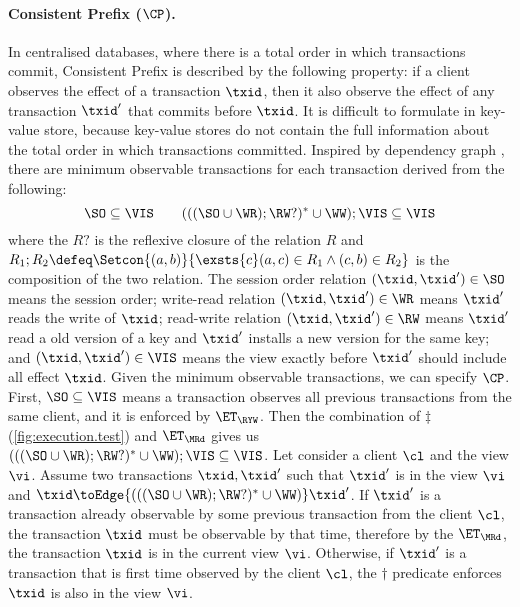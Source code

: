 \paragraph{Consistent Prefix ($\CP$).}
\label{para:cp}
In centralised databases, where there is a total order in which transactions commit, 
Consistent Prefix is described by the following property: 
if a client observes the effect of a transaction $\txid$,
then it also observe the effect of any transaction $\txid'$ that commits before $\txid$.
It is difficult to formulate in key-value store,
because key-value stores do not contain the full information about the total order in which transactions committed. 
Inspired by dependency graph \cite{.....},
there are minimum observable transactions for each transaction derived from the following:
\[
    \SO  \subseteq  \VIS \qquad
    ( ( ( \SO \cup \WR ) ; \RW? )^* \cup \WW ) ; \VIS \subseteq \VIS
\]
where the \( R? \) is the reflexive closure of the relation \( R \) 
and \( R_1 ; R_2 \defeq \Setcon{(a,b)}{\exsts{c} (a,c) \in R_1 \land (c,b) \in R_2 } \) is the composition of the two relation.
The session order relation \( (\txid, \txid') \in \SO \) means the session order;
write-read relation \( (\txid, \txid') \in \WR \) means \( \txid' \) reads the write of \( \txid \);
read-write relation \( (\txid, \txid') \in \RW \) means \( \txid' \) read a old version of a key 
and \( \txid' \) installs a new version for the same key;
and \( (\txid, \txid') \in \VIS \) means the view exactly before \( \txid' \) should include all effect \( \txid \).
Given the minimum observable transactions, we can specify $\CP$. 
First, \( \SO \subseteq \VIS \) means a transaction observes all previous transactions from the same client,
and it is enforced by \( \ET_\RYW \).
Then the combination of \( \ddagger\) (\cref{fig:execution.test}) and \( \ET_\MRd \) gives us \( ( ( ( \SO \cup \WR ) ; \RW? )^* \cup \WW ) ; \VIS \subseteq \VIS \).
Let consider a client \( \cl \) and the view \( \vi \).
Assume two transactions \( \txid, \txid' \)  such that \( \txid' \) is in the view \( \vi \) and \( \txid \toEdge{( ( ( \SO \cup \WR ) ; \RW? )^* \cup \WW )} \txid' \).
If \( \txid' \) is a transaction already observable by some previous transaction from the client \( \cl \), 
the transaction \( \txid \) must be observable by that time,
therefore by the \( \ET_\MRd \), the transaction \( \txid \) is in the current view \( \vi \).
Otherwise, if \( \txid' \) is a transaction that is first time observed by the client \( \cl \),
the \( \dagger \) predicate enforces \( \txid \) is also in the view \( \vi \).
